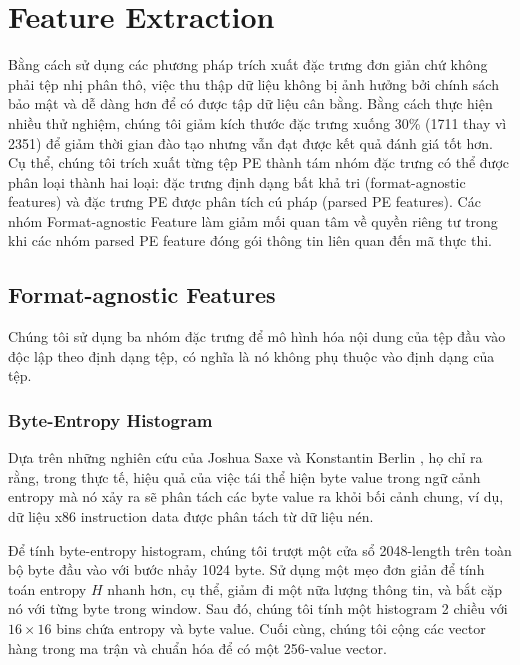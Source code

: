 \section{Feature Extraction}
\label{sec:feature-extraction}

Bằng cách sử dụng các phương pháp trích xuất đặc trưng đơn giản chứ không phải tệp nhị phân thô, việc thu thập dữ liệu không bị ảnh hưởng bởi chính sách bảo mật và dễ dàng hơn để có được tập dữ liệu cân bằng.
Bằng cách thực hiện nhiều thử nghiệm, chúng tôi giảm kích thước đặc trưng xuống 30\% (1711 thay vì 2351) để giảm thời gian đào tạo nhưng vẫn đạt được kết quả đánh giá tốt hơn.
Cụ thể, chúng tôi trích xuất từng tệp PE thành tám nhóm đặc trưng có thể được phân loại thành hai loại: đặc trưng định dạng bất khả tri (format-agnostic features) và đặc trưng PE được phân tích cú pháp (parsed PE features).
Các nhóm Format-agnostic Feature làm giảm mối quan tâm về quyền riêng tư trong khi các nhóm parsed PE feature đóng gói thông tin liên quan đến mã thực thi.

\subsection{Format-agnostic Features}

Chúng tôi sử dụng ba nhóm đặc trưng để mô hình hóa nội dung của tệp đầu vào độc lập theo định dạng tệp, có nghĩa là nó không phụ thuộc vào định dạng của tệp.

\subsubsection{Byte-Entropy Histogram}

Dựa trên những nghiên cứu của Joshua Saxe và Konstantin Berlin \cite{saxe2015deep}, họ chỉ ra rằng, trong thực tế, hiệu quả của việc tái thể hiện byte value trong ngữ cảnh entropy mà nó xảy ra sẽ phân tách các byte value ra khỏi bối cảnh chung, ví dụ, dữ liệu x86 instruction data  được phân tách từ dữ liệu nén.

Để tính byte-entropy histogram, chúng tôi trượt một cửa sổ 2048-length trên toàn bộ byte đầu vào với bước nhảy 1024 byte. Sử dụng một mẹo đơn giản để tính toán entropy $H$ nhanh hơn, cụ thể, giảm đi một nữa lượng thông tin, và bắt cặp nó với từng byte trong window. Sau đó, chúng tôi tính một histogram 2 chiều với $16 \times 16$ bins chứa entropy và byte value. Cuối cùng, chúng tôi cộng các vector hàng trong ma trận và chuẩn hóa để có một 256-value vector.

